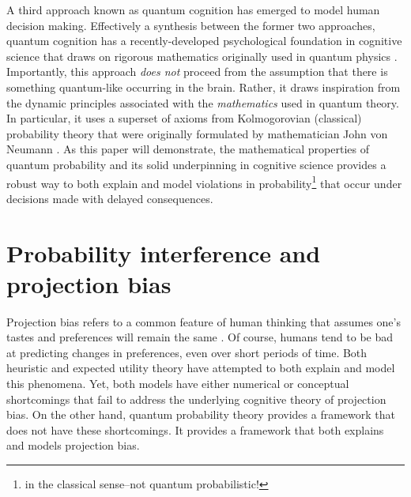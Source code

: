 \documentclass[12pt]{article}
\begin{document}
	A third approach known as quantum cognition has emerged to model human decision making. Effectively a synthesis between the former two approaches, quantum cognition has a recently-developed psychological foundation in cognitive science that draws on rigorous mathematics originally used in quantum physics \citep{bruza_wang_busemeyer_2015}. Importantly, this approach \textit{does not} proceed from the assumption that there is something quantum-like occurring in the brain. Rather, it draws inspiration from the dynamic principles associated with the \textit{mathematics} used in quantum theory. In particular, it uses a superset of axioms from Kolmogorovian (classical) probability theory that were originally formulated by mathematician John von Neumann \citep{neumann_1932}. As this paper will demonstrate, the mathematical properties of quantum probability and its solid underpinning in cognitive science provides a robust way to both explain and model violations in probability\footnote{in the classical sense--not quantum probabilistic!} that occur under decisions made with delayed consequences. 
	

	
	\section{Probability interference and projection bias}
	
		Projection bias refers to a common feature of human thinking that assumes one's tastes and preferences will remain the same \cite{loewenstein_odonoghue_rabin_2003}. Of course, humans tend to be bad at predicting changes in preferences, even over short periods of time. Both heuristic and expected utility theory have attempted to both explain and model this phenomena. Yet, both models have either numerical or conceptual shortcomings that fail to address the underlying cognitive theory of projection bias. On the other hand, quantum probability theory provides a framework that does not have these shortcomings. It provides a framework that both explains and models projection bias.
		
\end{document}
